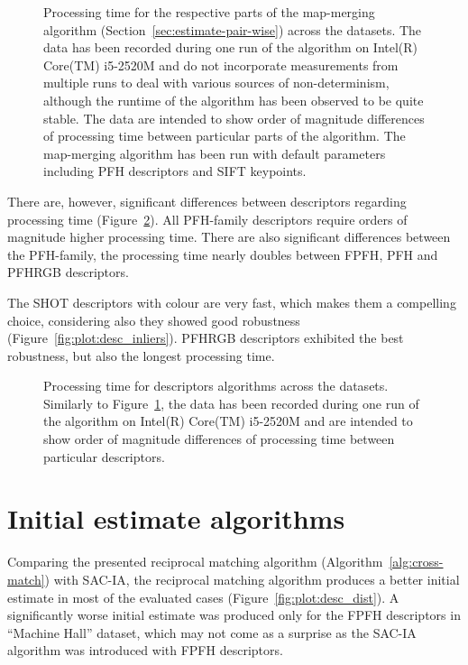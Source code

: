 \begin{figure}
  \centering
  
  \caption[Processing time per algorithm parts]{Processing time for the respective parts of the map-merging algorithm (Section~\ref{sec:estimate-pair-wise}) across the datasets. The data has been recorded during one run of the algorithm on Intel(R) Core(TM) i5-2520M and do not incorporate measurements from multiple runs to deal with various sources of non-determinism, although the runtime of the algorithm has been observed to be quite stable. The data are intended to show order of magnitude differences of processing time between particular parts of the algorithm. The map-merging algorithm has been run with default parameters including \gls{PFH} descriptors and \gls{SIFT} keypoints.}
  \label{fig:plot:perf}
\end{figure}

There are, however, significant differences between descriptors regarding processing time (Figure~\ref{fig:plot:desc_perf}). All \gls{PFH}-family descriptors require orders of magnitude higher processing time. There are also significant differences between the \gls{PFH}-family, the processing time nearly doubles between \gls{FPFH}, \gls{PFH} and \gls{PFHRGB} descriptors.

The \gls{SHOT} descriptors with colour are very fast, which makes them a compelling choice, considering also they showed good robustness (Figure~\ref{fig:plot:desc_inliers}). \gls{PFHRGB} descriptors exhibited the best robustness, but also the longest processing time.

\begin{figure}
  \centering
  
  \caption[Processing time per descriptors]{Processing time for descriptors algorithms across the datasets. Similarly to Figure~\ref{fig:plot:perf}, the data has been recorded during one run of the algorithm on Intel(R) Core(TM) i5-2520M and are intended to show order of magnitude differences of processing time between particular descriptors.}
  \label{fig:plot:desc_perf}
\end{figure}

\section{Initial estimate algorithms}
\label{sec:initial-estimate-algorithms}

Comparing the presented reciprocal matching algorithm (Algorithm~\ref{alg:cross-match}) with \gls{SAC-IA}, the reciprocal matching algorithm produces a better initial estimate in most of the evaluated cases (Figure~\ref{fig:plot:desc_dist}). A significantly worse initial estimate was produced only for the \gls{FPFH} descriptors in ``Machine Hall'' dataset, which may not come as a surprise as the \gls{SAC-IA} algorithm was introduced with \gls{FPFH} descriptors.

